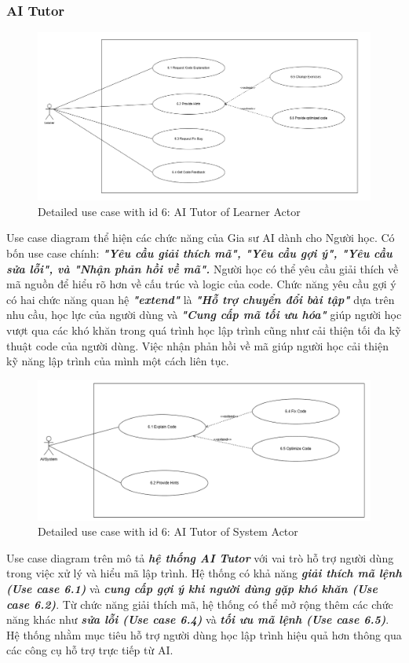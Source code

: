 \subsubsection{AI Tutor}
\begin{figure}[H]
    \centering
    \includegraphics[scale=0.3]{Images/Usecase/usecase-AI Tutor - Learner.drawio.png}
    \caption{Detailed use case with id 6: AI Tutor of Learner Actor}
    \label{fig:enter-label}
\end{figure}
\quad Use case diagram thể hiện các chức năng của Gia sư AI dành cho Người học. Có bốn use case chính:  \textbf{\textit{"Yêu cầu giải thích mã", "Yêu cầu gợi ý", "Yêu cầu sửa lỗi", và "Nhận phản hồi về mã".}}
Người học có thể yêu cầu giải thích về mã nguồn để hiểu rõ hơn về cấu trúc và logic của code. Chức năng yêu cầu gợi ý có hai chức năng quan hệ \textbf{\textit{"extend"}} là \textbf{\textit{"Hỗ trợ chuyển đổi bài tập"}} dựa trên nhu cầu, học lực của người dùng và \textbf{\textit{"Cung cấp mã tối ưu hóa"}} giúp người học vượt qua các khó khăn trong quá trình học lập trình cũng như cải thiện tối đa kỹ thuật code của người dùng. Việc nhận phản hồi về mã giúp người học cải thiện kỹ năng lập trình của mình một cách liên tục.
\begin{figure}[H]
    \centering
    \includegraphics[scale=0.4]{Images/Usecase/usecase-AI Tutor - System.drawio.png}
    \caption{Detailed use case with id 6: AI Tutor of System Actor}
    \label{fig:enter-label}
\end{figure}
\quad Use case diagram trên mô tả  \textbf{\textit{hệ thống AI Tutor}} với vai trò hỗ trợ người dùng trong việc xử lý và hiểu mã lập trình. Hệ thống có khả năng  \textbf{\textit{giải thích mã lệnh (Use case 6.1)}} và  \textbf{\textit{cung cấp gợi ý khi người dùng gặp khó khăn (Use case 6.2)}}. Từ chức năng giải thích mã, hệ thống có thể mở rộng thêm các chức năng khác như  \textbf{\textit{sửa lỗi (Use case 6.4)}} và  \textbf{\textit{tối ưu mã lệnh (Use case 6.5)}}. Hệ thống nhằm mục tiêu hỗ trợ người dùng học lập trình hiệu quả hơn thông qua các công cụ hỗ trợ trực tiếp từ AI.
\newpage
